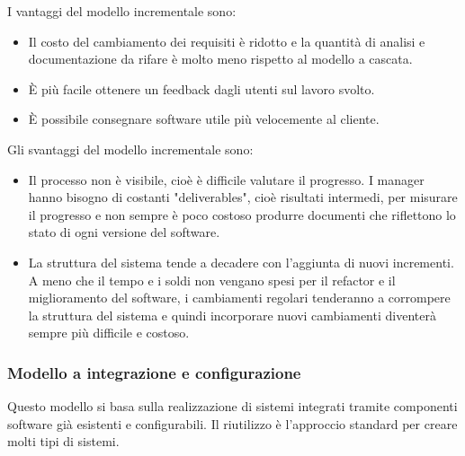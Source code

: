 \documentclass[a4paper]{article}
\begin{document}
\noindent
I vantaggi del modello incrementale sono:
\begin{itemize}
  \item Il costo del cambiamento dei requisiti è ridotto e la quantità di analisi e
    documentazione da rifare è molto meno rispetto al modello a cascata.

  \item È più facile ottenere un feedback dagli utenti sul lavoro svolto.

  \item È possibile consegnare software utile più velocemente al cliente.
\end{itemize}
Gli svantaggi del modello incrementale sono:
\begin{itemize}
  \item Il processo non è visibile, cioè è difficile valutare il progresso. I manager
    hanno bisogno di costanti "deliverables", cioè risultati intermedi, per misurare
    il progresso e non sempre è poco costoso produrre documenti che riflettono lo stato
    di ogni versione del software.

  \item La struttura del sistema tende a decadere con l'aggiunta di nuovi incrementi.
    A meno che il tempo e i soldi non vengano spesi per il refactor e il miglioramento
    del software, i cambiamenti regolari tenderanno a corrompere la struttura del sistema
    e quindi incorporare nuovi cambiamenti diventerà sempre più difficile e costoso.
\end{itemize}

\subsubsection{Modello a integrazione e configurazione}
Questo modello si basa sulla realizzazione di sistemi integrati tramite componenti
software già esistenti e configurabili. Il riutilizzo è l'approccio standard per
creare molti tipi di sistemi.
\end{document}
